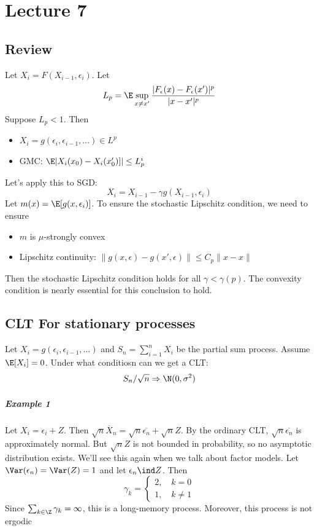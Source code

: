 \section{Lecture 7}

\subsection*{Review}
Let \(X_i = F(X_{i-1}, \epsilon_i)\). Let
\[L_p = \E \sup_{x \neq x'} \frac{|F_\epsilon(x) - F_\epsilon(x')|^p}{|x - x'|^p}\]
Suppose \(L_p < 1\). Then

\begin{itemize}
\tightlist
\item
  \(X_i = g(\epsilon_i, \epsilon_{i-1}, \dots) \in L^p\)
\item
  GMC: \(\E|X_i(x_0) - X_i(x_0')]| \leq L_p^i\)
\end{itemize}

Let's apply this to SGD:
\[X_i = X_{i-1} - \gamma g(X_{i-1}, \epsilon_i)\]
Let \(m(x) = \E[g(x, \epsilon_i)]\). To ensure the stochastic Lipschitz condition, we need to ensure

\begin{itemize}
\tightlist
\item
  \(m\) is \(\mu\)-strongly convex
\item
  Lipschitz continuity: \(\|g(x, \epsilon) - g(x', \epsilon)\| \leq C_p \|x - x\|\)
\end{itemize}

Then the stochastic Lipschitz condition holds for all \(\gamma < \gamma(p)\). The convexity condition is nearly essential for this conclusion to hold.

\subsection*{CLT For stationary processes}
Let \(X_i = g(\epsilon_i, \epsilon_{i-1}, \dots)\) and \(S_n = \sum_{i=1}^n X_i\) be the partial sum process. Assume \(\E[X_i] = 0\). Under what conditiosn can we get a CLT:
\[S_n/\sqrt{n} \Rightarrow \N(0, \sigma^2)\]

\subparagraph{Example 1}

Let \(X_i = \epsilon_i + Z\). Then \(\sqrt{n} \overline{X}_n = \sqrt{n} \overline{\epsilon_n} + \sqrt{n} Z\). By the ordinary CLT, \(\sqrt{n} \overline{\epsilon_n}\) is approximately normal. But \(\sqrt{n} Z\) is not bounded in probability, so no asymptotic distribution exists. We'll see this again when we talk about factor models. Let \(\Var(\epsilon_n) = \Var(Z) = 1\) and let \(\epsilon_n \ind Z\). Then
\[\gamma_k =
\begin{cases}
2, \quad k = 0 \\
1, \quad k \neq 1
\end{cases}\]
Since \(\sum_{k \in \Z} \gamma_k = \infty\), this is a long-memory process. Moreover, this process is not ergodic

